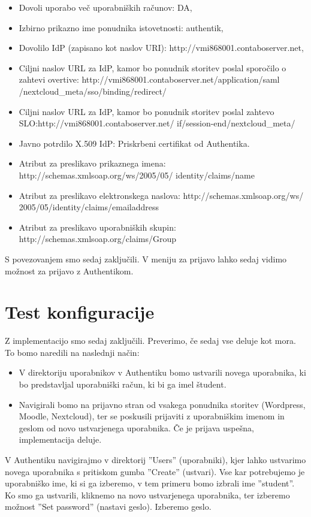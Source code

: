 \documentclass[a4paper,12pt,openright]{book}
\begin{document}
\begin{itemize}
    \item Dovoli uporabo več uporabniških računov: DA,
    \item Izbirno prikazno ime ponudnika istovetnosti: authentik,
    \item Dovolilo IdP (zapisano kot naslov URI): http://vmi868001.contaboserver.net,
    \item Ciljni naslov URL za IdP, kamor bo ponudnik storitev poslal sporočilo o zahtevi overtive: http://vmi868001.contaboserver.net/application/saml
    /nextcloud\_meta/sso/binding/redirect/
    \item Ciljni naslov URL za IdP, kamor bo ponudnik storitev poslal zahtevo SLO:http://vmi868001.contaboserver.net/
    if/session-end/nextcloud\_meta/
    \item Javno potrdilo X.509 IdP: Priskrbeni certifikat od Authentika. 
    \item Atribut za preslikavo prikaznega imena: http://schemas.xmlsoap.org/ws/2005/05/
    identity/claims/name
    \item Atribut za preslikavo elektronskega naslova: http://schemas.xmlsoap.org/ws/
    2005/05/identity/claims/emailaddress
    \item Atribut za preslikavo uporabniških skupin: http://schemas.xmlsoap.org/claims/Group
\end{itemize}

S povezovanjem smo sedaj zaključili. V meniju za prijavo lahko sedaj vidimo možnost za prijavo z Authentikom.


\section{Test konfiguracije}

Z implementacijo smo sedaj zaključili. Preverimo, če sedaj vse deluje kot mora. 
To bomo naredili na naslednji način:
\begin{itemize}
    \item V direktoriju uporabnikov v Authentiku bomo ustvarili novega uporabnika, ki bo predstavljal uporabniški račun, ki bi ga imel študent.
    \item Navigirali bomo na prijavno stran od vsakega ponudnika storitev (Wordpress, Moodle, Nextcloud), ter se poskusili prijaviti z uporabniškim imenom in geslom od novo ustvarjenega uporabnika. Če je prijava uspešna, implementacija deluje. 
\end{itemize}

V Authentiku navigirajmo v direktorij ''Users'' (uporabniki), kjer lahko ustvarimo novega uporabnika s pritiskom gumba ''Create'' (ustvari). Vse kar potrebujemo je uporabniško ime, ki si ga izberemo, v tem primeru bomo izbrali ime ''student''. Ko smo ga ustvarili, kliknemo na novo ustvarjenega uporabnika, ter izberemo možnost ''Set password'' (nastavi geslo). Izberemo geslo.  
\end{document}
